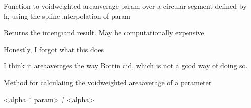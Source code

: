 \documentclass[letterpaper,10pt,english]{sphinxmanual}
\begin{document}
\begin{fulllineitems}

\begin{fulllineitems}
\label{\detokenize{api/MARIGOLD.Condition:MARIGOLD.Condition.spline_void_area_avg}}
\pysigstartsignatures
{}
\pysigstopsignatures
\sphinxAtStartPar
Function to void\sphinxhyphen{}weighted area\sphinxhyphen{}average param over a circular segment defined by h, using the spline interpolation of param

\sphinxAtStartPar
Returns the intengrand result. May be computationally expensive

\end{fulllineitems}


\begin{fulllineitems}
\label{\detokenize{api/MARIGOLD.Condition:MARIGOLD.Condition.top_bottom}}
\pysigstartsignatures
{}
\pysigstopsignatures
\sphinxAtStartPar
Honestly, I forgot what this does

\sphinxAtStartPar
I think it area\sphinxhyphen{}averages the way Bottin did, which is not
a good way of doing so.

\end{fulllineitems}


\begin{fulllineitems}
\label{\detokenize{api/MARIGOLD.Condition:MARIGOLD.Condition.void_area_avg}}
\pysigstartsignatures
{}
\pysigstopsignatures
\sphinxAtStartPar
Method for calculating the void\sphinxhyphen{}weighted area\sphinxhyphen{}average of a parameter

\sphinxAtStartPar
\textless{}alpha * param\textgreater{} / \textless{}alpha\textgreater{}

\end{fulllineitems}


\end{fulllineitems}
\end{document}
